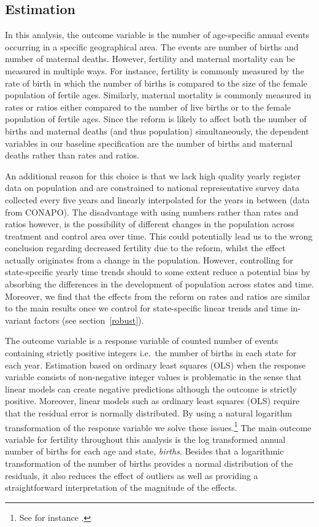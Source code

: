 \documentclass[a4paper, 11pt]{article}
\begin{document}
\begin{spacing}{2}
\subsection{Estimation}\label{Estimation}
In this analysis, the outcome variable is the number of age-specific annual events occurring in a specific geographical area. The events are number of births and number of maternal deaths. However, fertility and maternal mortality can be measured in multiple ways. For instance, fertility is commonly measured by the rate of birth in which the number of births is compared to the size of the female population of fertile ages. Similarly, maternal mortality is commonly measured in rates or ratios either compared to the number of live births or to the female population of fertile ages. Since the reform is likely to affect both the number of births and maternal deaths (and thus population) simultaneously, the dependent variables in our baseline specification are the number of births and maternal deaths rather than rates and ratios. 

An additional reason for this choice is that we lack high quality yearly register data on population and are constrained to national representative survey data collected every five years and linearly interpolated for the years in between (data from CONAPO). The disadvantage with using numbers rather than rates and ratios however, is the possibility of different changes in the population across treatment and control area over time. This could potentially lead us to the wrong conclusion regarding decreased fertility due to the reform, whilst the effect actually originates from a change in the population. However, controlling for state-specific yearly time trends should to some extent reduce a potential bias by absorbing the differences in the development of population across states and time.  Moreover, we find that the effects from the reform on rates and ratios are similar to the main results once we control for state-specific linear trends and time in-variant factors (see section~\ref{robust}).

The outcome variable is a response variable of counted number of events containing strictly positive integers i.e.\ the number of births in each state for each year. Estimation based on ordinary least squares (OLS) when the response variable consists of non-negative integer values is problematic in the sense that linear models can create negative predictions although the outcome is strictly positive. Moreover, linear models such as ordinary least squares (OLS) require that the residual error is normally distributed. By using a natural logarithm transformation of the response variable we solve these issues.\footnote{See for instance \cite{wooldridge2010econometric}.} The main outcome variable for fertility throughout this analysis is the log transformed annual number of births for each age and state, \textit{births}. Besides that a logarithmic transformation of the number of births provides a normal distribution of the residuals, it also reduces the effect of outliers as well as providing a straightforward interpretation of the magnitude of the effects.


\end{spacing}
\end{document}
